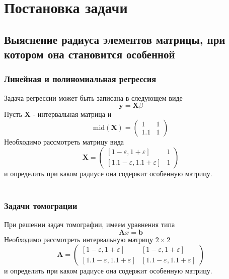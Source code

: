 \section{Постановка задачи}
\subsection{Выяснение радиуса элементов матрицы, при котором она становится особенной}
\subsubsection{Линейная и полиномиальная регрессия}
Задача регрессии может быть записана в следующем виде
\begin{equation}
    \textbf{y}=\textbf{X}\beta
\end{equation}
Пусть $\textbf{X}$ - интервальная матрица и
\begin{equation}
\mathrm{mid}(\textbf{X})=
\begin{pmatrix}
1 & 1 \\
1.1 & 1 
\end{pmatrix}
\end{equation}
Необходимо рассмотреть матрицу вида
\begin{equation}
\textbf{X}=
\begin{pmatrix}
[1-\varepsilon, 1+\varepsilon] & 1 \\
[1.1-\varepsilon, 1.1+\varepsilon] & 1 
\end{pmatrix}
\end{equation}
и определить при каком радиусе она содержит особенную матрицу.\\\\
\subsubsection{Задачи томограции}
При решении задач томографии, имеем уравнения типа
\begin{equation}
    \textbf{A}x=\textbf{b}
\end{equation}
Необходимо рассмотреть интервальную матрицу $2\times2$
\begin{equation}
\textbf{A}=
\begin{pmatrix}
[1-\varepsilon, 1+\varepsilon] & [1-\varepsilon, 1+\varepsilon] \\
[1.1-\varepsilon, 1.1+\varepsilon] & [1.1-\varepsilon, 1.1+\varepsilon] 
\end{pmatrix}
\end{equation}
и определить при каком радиусе она содержит особенную матрицу.
